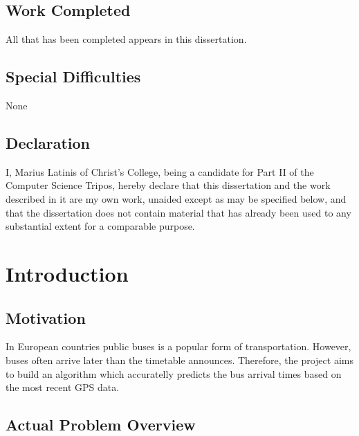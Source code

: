 \documentclass[12pt,a4paper,oneside,openright]{report}
\begin{document}
\section*{Work Completed}

All that has been completed appears in this dissertation.

\section*{Special Difficulties}

None
 
\section*{Declaration}

I, Marius Latinis of Christ's College, being a candidate for Part II of the Computer
Science Tripos, hereby declare that this dissertation and the work described 
in it are my own work, unaided except as may be specified below,
and that the dissertation does not contain material that has already been used to any substantial extent for a comparable purpose.

\bigskip
{}

\medskip
{}

\tableofcontents


\pagestyle{plain}








\chapter{Introduction}

\section*{Motivation}

In European countries public buses is a popular form of transportation. However,
buses often arrive later than the timetable announces. Therefore, the project aims
to build an algorithm which accuratelly predicts the bus arrival times based on the
most recent GPS data.

\section*{Actual Problem Overview}
\end{document}
